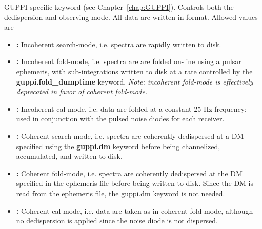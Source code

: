 \begin{description}[font=\bfseries\large,leftmargin=*]
\item[guppi.obsmode] {\gls{GUPPI}-specific keyword (see Chapter~\ref{chap:GUPPI}).
Controls both the dedispersion and observing mode. All data are written in
format.  Allowed values are}
    \begin{itemize}
    \item \textbf{:} Incoherent search-mode, i.e. spectra are
        rapidly written to disk.
    \item \textbf{:} Incoherent fold-mode, i.e. spectra are are
        folded on-line using a pulsar ephemeris, with sub-integrations
        written to disk at a rate controlled by the
        \textbf{guppi.fold\_dumptime} keyword.  \emph{Note: incoherent
          fold-mode is effectively deprecated in favor of coherent
          fold-mode.}
    \item \textbf{:} Incoherent cal-mode, i.e. data are folded at a
        constant 25 Hz frequency; used in conjunction with the pulsed
        noise diodes for each receiver.
    \item \textbf{:} Coherent search-mode,
        i.e. spectra are coherently dedispersed at a DM specified
        using the \textbf{guppi.dm} keyword before being channelized,
        accumulated, and written to disk.
    \item \textbf{:} Coherent fold-mode, i.e. spectra
        are coherently dedispersed at the DM specified in the
        ephemeris file before being written to disk.  Since the DM is
        read from the ephemeris file, the guppi.dm keyword is not
        needed.
    \item \textbf{:} Coherent cal-mode, i.e. data are
        taken as in coherent fold mode, although no dedispersion is
        applied since the noise diode is not dispersed.
    \end{itemize}


\end{description}
